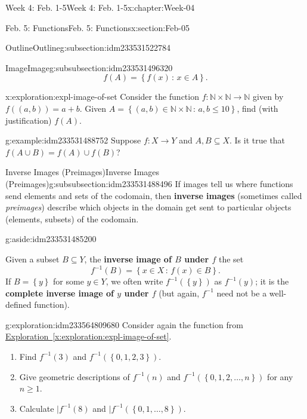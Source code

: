 \documentclass[oneside,10pt,]{book}
\newcommand{\xreffont}{\relax}
\newcommand{\terminology}[1]{\textbf{#1}}
\numberwithin{equation}{section}
\renewcommand{\le}{\leqslant}
\renewcommand{\ge}{\geqslant}
\newcommand{\set}[1]{\left\{ {#1} \right\}}
\newcommand{\setof}[2]{{\left\{#1\,\colon\,#2\right\}}}
\def\N{{\mathbb N}}
\newcommand{\N}{\mathbb N}
\begin{document}
\begin{chapterptx}{Week 4: Feb. 1-5}{}{Week 4: Feb. 1-5}{}{}{x:chapter:Week-04}
\begin{sectionptx}{Feb. 5: Functions}{}{Feb. 5: Functions}{}{}{x:section:Feb-05}
\begin{subsectionptx}{Outline}{}{Outline}{}{}{g:subsection:idm233531522784}
\begin{subsubsectionptx}{Image}{}{Image}{}{}{g:subsubsection:idm233531496320}
\begin{equation*}
f(A) = \setof{f(x)}{x\in A}.
\end{equation*}
%
\begin{exploration}{}{x:exploration:expl-image-of-set}%
Consider the function \(f : \N\times\N \to \N\) given by \(f((a,b)) = a+b\). Given \(A = \setof{(a,b)\in \N\times\N}{a,b\le 10}\), find (with justification) \(f(A)\).%
\end{exploration}%
\begin{example}{}{g:example:idm233531488752}%
Suppose \(f : X\to Y\) and \(A,B\subseteq X\). Is it true that \(f(A\cup B) = f(A)\cup f(B)\)?%
\end{example}
\end{subsubsectionptx}
%
%
\typeout{************************************************}
\typeout{************************************************}
%
\begin{subsubsectionptx}{Inverse Images (Preimages)}{}{Inverse Images (Preimages)}{}{}{g:subsubsection:idm233531488496}
If images tell us where functions send elements and sets of the codomain, then \terminology{inverse images} (sometimes called \emph{preimages}) describe which objects in the domain get sent to particular objects (elements, subsets) of the codomain. \begin{aside}{}{g:aside:idm233531485200}%
\end{aside}
%
\par
Given a subset \(B\subseteq Y\), the \terminology{inverse image of \(B\) under \(f\)} the set%
\begin{equation*}
f^{-1}(B) = \setof{x\in X}{f(x)\in B}.
\end{equation*}
If \(B = \set{y}\) for some \(y\in Y\), we often write \(f^{-1}(\set{y})\) as \(f^{-1}(y)\); it is the \terminology{complete inverse image of \(y\) under \(f\)} (but again, \(f^{-1}\) need not be a well-defined function).%
\begin{exploration}{}{g:exploration:idm233564809680}%
Consider again the function from \hyperref[x:exploration:expl-image-of-set]{Exploration~{\xreffont\ref{x:exploration:expl-image-of-set}}}.%
%
\begin{enumerate}
\item{}Find \(f^{-1}(3)\) and \(f^{-1}(\set{0,1,2,3})\).%
\item{}Give geometric descriptions of \(f^{-1}(n)\) and \(f^{-1}(\set{0,1,2,\ldots,n})\) for any \(n\ge 1\).%
\item{}Calculate \(|f^{-1}(8)\) and \(|f^{-1}(\set{0,1,\ldots,8})\).%

\end{enumerate}
\end{exploration}
\end{subsubsectionptx}
\end{subsectionptx}
\end{sectionptx}
\end{chapterptx}
\end{document}
